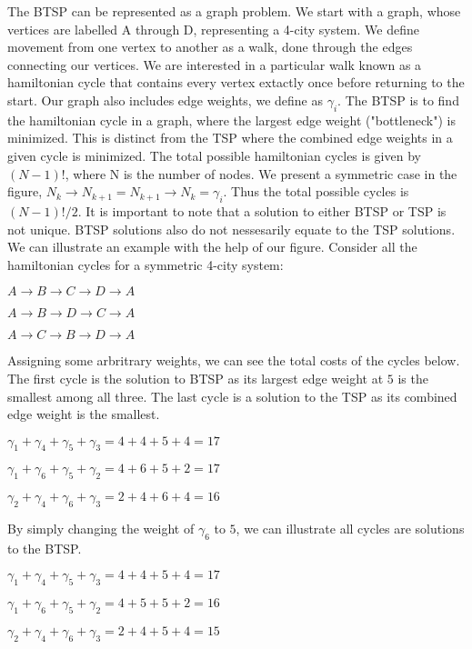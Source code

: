 \documentclass[twocolumn,showpacs,preprintnumbers,amsmath,amssymb]{revtex4}
\begin{document}
		
		The BTSP can be represented as a graph problem.  We start with a graph, whose vertices are labelled A through D, representing a 4-city system. We define movement from one vertex to another as a walk, done through the edges connecting our vertices. We are interested in a particular walk known as a hamiltonian cycle that contains every vertex extactly once before returning to the start. Our graph also includes edge weights, we define as $ \gamma_i $.
		The BTSP is to find the hamiltonian cycle in a graph, where the largest edge weight ("bottleneck") is minimized. This is distinct from the TSP where the combined edge weights in a given cycle is minimized. The total possible hamiltonian cycles is given by $(N-1)!$, where N is the number of nodes. We present a symmetric case in the figure,  $N_k \rightarrow N_{k+1} = N_{k+1} \rightarrow N_{k} = \gamma_i$. Thus the total possible cycles is  $(N-1)!/2$.  It is important to note that a solution to either BTSP or TSP is not unique. BTSP solutions also do not nessesarily equate to the TSP solutions. We can illustrate an example with the help of our figure. Consider all the hamiltonian cycles for a symmetric 4-city system:
		\begin{center}
		$ A \rightarrow B \rightarrow C \rightarrow D \rightarrow A $
		
		$ A \rightarrow B \rightarrow D \rightarrow C \rightarrow A $ 
		
		$ A \rightarrow C \rightarrow B \rightarrow D \rightarrow A $
	    \end{center}
		
		Assigning some arbritrary weights, we can see the total costs of the cycles below. The first cycle is the solution to BTSP as its largest edge weight at $5$ is the smallest among all three. The last cycle is a solution to the TSP as its combined edge weight is the smallest.
		\begin{center}
		$\gamma_1 + \gamma_4 + \gamma_5 + \gamma_3 = 4 + 4 + 5 + 4 = 17$
		
		$ \gamma_1 + \gamma_6 + \gamma_5 + \gamma_2 = 4 + 6 + 5 + 2 = 17$
		
		$  \gamma_2 + \gamma_4 + \gamma_6 + \gamma_3 = 2 + 4 + 6 + 4 = 16$
		\end{center}
		

		By simply changing the weight of $\gamma_6$ to $5$, we can illustrate all cycles are solutions to the BTSP. 
		
		\begin{center}

			$\gamma_1 + \gamma_4 + \gamma_5 + \gamma_3 = 4 + 4 + 5 + 4 = 17$
			
			$ \gamma_1 + \gamma_6 + \gamma_5 + \gamma_2 = 4 + 5 + 5 + 2 = 16$
			
			$  \gamma_2 + \gamma_4 + \gamma_6 + \gamma_3 = 2 + 4 + 5 + 4 = 15$
		\end{center}
		
\end{document}
